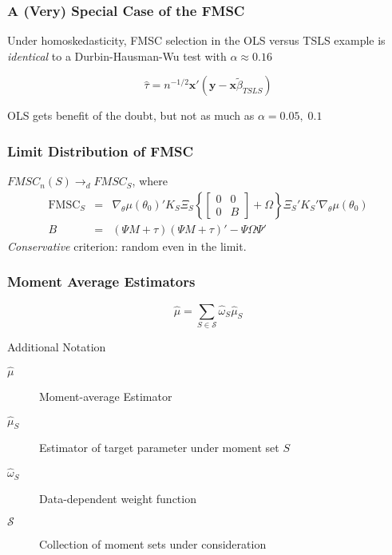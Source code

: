 \begin{frame}
	\frametitle{A (Very) Special Case of the FMSC}

	Under homoskedasticity, FMSC selection in the OLS versus TSLS example is \emph{identical} to a Durbin-Hausman-Wu test with $\alpha \approx 0.16$

$$\widehat{\tau} =  n^{-1/2} \mathbf{x}'(\mathbf{y} - \mathbf{x}\widetilde{\beta}_{TSLS})$$

	\vspace{1em} 
	\alert{OLS gets benefit of the doubt, but not as much as $\alpha = 0.05,\; 0.1$}
\end{frame}
\begin{frame}
	\frametitle{Limit Distribution of FMSC}
	$FMSC_n(S) \rightarrow_d FMSC_S$, where
	\begin{eqnarray*}
		\mbox{FMSC}_S &=& \nabla_\theta\mu(\theta_0)'K_S\Xi_S \left\{\left[\begin{array}{cc}0&0\\0& B \end{array}\right] + \Omega\right\}\Xi_S'K_S'\nabla_\theta\mu(\theta_0)\\
		B &=& (\Psi M + \tau)(\Psi M + \tau)' - \Psi \Omega \Psi'
	\end{eqnarray*}
	\alert{\emph{Conservative} criterion: random even in the limit.}
\end{frame}

\begin{frame}

	\frametitle{Moment Average Estimators}
	
		$$\widehat{\mu}=\sum_{S \in \mathscr{S}} \widehat{\omega}_S \widehat{\mu}_S$$
		\begin{block}{Additional Notation}
		\begin{description}
			\item[$\widehat{\mu}$] Moment-average Estimator
			\item[$\widehat{\mu}_S$] Estimator of target parameter under moment set $S$
			\item[$\widehat{\omega}_S$] Data-dependent weight function
			\item[$\mathscr{S}$] Collection of moment sets under consideration
		\end{description}
		\end{block}
		
\end{frame}

